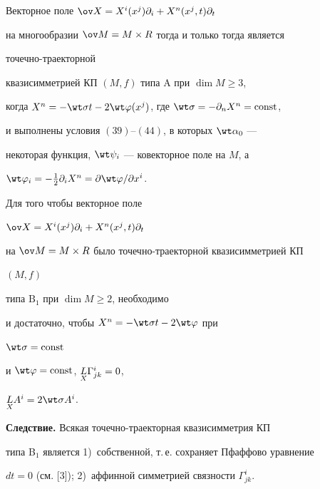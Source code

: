  


\begin{thm} 


Векторное поле $\ov X=X^i(x^j)\partial_i+X^n(x^j,t)\partial_t$ 


на многообразии $\ov M=M\times R$ тогда и только тогда является 


точечно-траекторной 


квазисимметрией КП $(M,f)$ типа $\mathrm A$ при $\dim M\ge3$, 


когда $X^n=-\wt\sigma t-2\wt\varphi(x^j)$, где $\wt\sigma=-\partial_n 


X^n=\const$, 


и выполнены условия $(39)$--$(44)$, в которых $\wt\alpha_0$ --- 


некоторая функция, $\wt\psi_i$ --- ковекторное поле на $M$, а 


$\wt\varphi_i=-\frac{1}{2}\partial_i X^n=\partial\wt\varphi/\partial 


x^i$. 


\end{thm} 


 


\begin{thm} 


Для того чтобы векторное поле 


$\ov X=X^i(x^j)\partial_i+X^n(x^j,t)\partial_t$ 


на $\ov M=M\times R$ было точечно-траекторной квазисимметрией КП 


$(M,f)$ 


типа $\mathrm B_1$ при $\dim M\ge2$, необходимо 


и достаточно, чтобы $X^n=-\wt\sigma t-2\wt\varphi$ при 


$\wt\sigma=\const$ 


и $\wt\varphi=\const$, $\underset{X}{L}{}\Gamma^i_{j k}=0$, 


$\down{X}{L}A^i=2\wt\sigma A^i$. 


\end{thm} 


 


{\bf Следствие.} Всякая точечно-траекторная квазисимметрия КП 


типа B$_1$ является 1)~собственной, т.\,е. сохраняет Пфаффово уравнение 


$dt=0$ (см. [3]); 2)~аффинной симметрией связности $\Gamma^i_{j k}$. 


